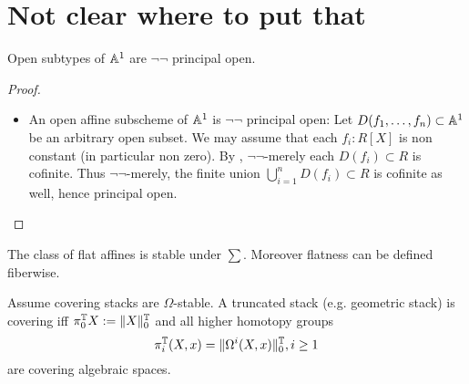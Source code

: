 \documentclass{article}
\begin{document}
\section{Not clear where to put that}
\begin{lemma}
	Open subtypes of $\mathbb{A}^1$ are $\lnot \lnot$ principal open. %
\end{lemma}
\begin{proof}
	\begin{itemize}
		\item An open affine subscheme of $\mathbb{A}^1$ is $\lnot \lnot$ principal open: Let $D(f_1,\hdots,f_n) \subset \mathbb{A}^1$ be an arbitrary open subset. We may assume that each $f_i : R[X]$ is non constant (in particular non zero). By \todocite, $\lnot \lnot$-merely each $D(f_i) \subset R$ is cofinite. Thus $\lnot \lnot$-merely, the finite union $\bigcup_{i=1}^n D(f_i) \subset R$ is cofinite as well, hence principal open. %
	\end{itemize}
\end{proof}
\begin{theorem}[TODO]{\label{thm:FlatAffines}}
	The class of flat affines is stable under $\sum$. Moreover flatness can be defined fiberwise.
\end{theorem}
\begin{prop}{\label{prop:htpyGroups}}
	Assume covering stacks are $\Omega$-stable.
	A truncated stack (e.g. geometric stack) is covering iff $\pi_0^{\mathbb{T}} X := \|X\|_0^{\mathbb{T}}$ and all higher homotopy groups 
	\[
	\pi_i^{\mathbb{T}}(X,x) = \|\Omega^i (X , x)\|_0^{\mathbb{T}} , i \ge 1
	\]
	are covering algebraic spaces.
\end{prop}
\end{document}
